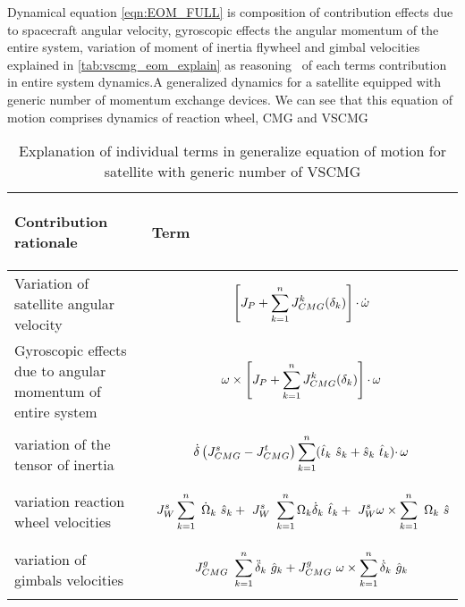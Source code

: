 Dynamical equation \autoref{eqn:EOM_FULL} is composition of contribution effects due to spacecraft angular velocity, gyroscopic effects the angular momentum of the entire system, variation of moment of inertia flywheel and gimbal velocities explained in \autoref{tab:vscmg_eom_explain} as reasoning \ of each terms contribution in entire system dynamics.A generalized dynamics for a satellite equipped with generic number of momentum exchange devices. We can see that this equation of motion comprises dynamics of reaction wheel, CMG and VSCMG 
\begin{table}[!h]
\centering
\begin{tabular}{p{}||p{}}
\toprule
\begin{center} Contribution rationale  \end{center}& \begin{center}
     Term
 \end{center} \\
\midrule
Variation of satellite angular velocity & 
\begin{equation*}
\left[ J_{P} +\sum ^{n}_{k=1} J^{k}_{CMG}( \delta_{k})\right] \cdotp \dot{\omega }
\vspace{-1em}\end{equation*} \\
\hline 
 Gyroscopic effects due to angular momentum of entire system & 
\begin{equation*}
\omega \times \left[ J_{P} +\sum ^{n}_{k=1} J^{k}_{CMG}( \delta_{k})\right] \cdotp \omega 
\vspace{-1em}\end{equation*} \\
\hline 
 variation of the tensor of inertia & 
\begin{equation*}
\dot{\delta}\left( J^{s}_{CMG} -J^{t}_{CMG}\right)\sum ^{n}_{k=1}(\hat{t}_{k} \ \hat{s}_{k} +\hat{s}_{k} \ \hat{t}_{k}) \cdotp \omega 
\vspace{-1em}\end{equation*} \\
\hline 
variation reaction wheel velocities & 
\begin{equation*}
\ J^{s}_{W}\sum ^{n}_{k=1} \ \dot{\Omega }_{k} \ \hat{s}_{k} +\ J^{s}_{W} \ \sum ^{n}_{k=1} \Omega _{k}\dot{\delta}_{k} \ \hat{t}_{k} +\ J^{s}_{W} \omega \times \sum ^{n}_{k=1} \ \Omega _{k} \ \hat{s}
\vspace{-1em}\end{equation*} \\
\hline 
 variation of gimbals velocities & 
\begin{equation*}
J^{g}_{CMG} \ \sum ^{n}_{k=1}\ddot{\delta}_{k} \ \hat{g}_{k} +J^{g}_{CMG} \ \omega \times \sum ^{n}_{k=1}\dot{\delta}_{k} \ \hat{g}_{k}
\vspace{-1em}\end{equation*} \\
\bottomrule
\end{tabular}
    \caption{Explanation of individual terms in generalize equation of motion for satellite with generic number of VSCMG}
    \label{tab:vscmg_eom_explain}
\end{table}

